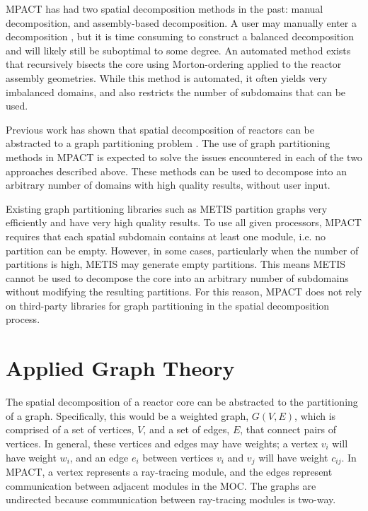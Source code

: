 {{    MPACT has had two spatial decomposition methods in the past: manual decomposition, and assembly-based decomposition.
    A user may manually enter a decomposition \cite{StimpsonPartitioning2017}, but it is time consuming to construct a balanced decomposition and will likely still be suboptimal to some degree.
    An automated method exists that recursively bisects the core using Morton-ordering \cite{Morton1966} applied to the reactor assembly geometries.
    While this method is automated, it often yields very imbalanced domains, and also restricts the number of subdomains that can be used.

    Previous work has shown that spatial decomposition of reactors can be abstracted to a graph partitioning problem \cite{Fitzgerald2017}.
    The use of graph partitioning methods in MPACT is expected to solve the issues encountered in each of the two approaches described above.
    These methods can be used to decompose into an arbitrary number of domains with high quality results, without user input.

    Existing graph partitioning libraries such as METIS \cite{METIS} partition graphs very efficiently and have very high quality results.
    To use all given processors, MPACT requires that each spatial subdomain contains at least one module, i.e. no partition can be empty.
    However, in some cases, particularly when the number of partitions is high, METIS may generate empty partitions.
    This means METIS cannot be used to decompose the core into an arbitrary number of subdomains without modifying the resulting partitions.
    For this reason, MPACT does not rely on third-party libraries for graph partitioning in the spatial decomposition process.
  }
  \section{Applied Graph Theory}{\label{sec:Spatial Decomposition:Applied Graph Theory}
    The spatial decomposition of a reactor core can be abstracted to the partitioning of a graph.
    Specifically, this would be a weighted graph, $G(V,E)$, which is comprised of a set of vertices, $V$, and a set of edges, $E$, that connect pairs of vertices.
    In general, these vertices and edges may have weights; a vertex $v_i$ will have weight $w_i$, and an edge $e_i$ between vertices $v_i$ and $v_j$ will have weight $c_{ij}$.
    In MPACT, a vertex represents a ray-tracing module, and the edges represent communication between adjacent modules in the \ac{MOC}.
    The graphs are undirected because communication between ray-tracing modules is two-way.

}}
